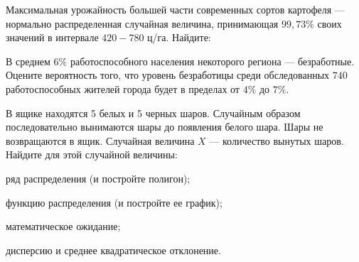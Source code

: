 \vfil

\begin{zkrPlain}{25}\noindent 
	Максимальная урожайность большей части современных сортов картофеля — нормально распределенная случайная величина, принимающая $99{,}73\%$ своих значений в интервале $420-780$ ц/га. Найдите: \par {}
 
\end{zkrPlain}

\vfil

\begin{zkrPlain}{25}\noindent 
	В среднем $ 6 \% $ работоспособного населения некоторого региона --- безработные. Оцените вероятность того, что уровень безработицы среди обследованных $ 740 $ работоспособных жителей города будет в пределах от $ 4 \% $ до $ 7 \% $.
 
\end{zkrPlain}

\newpage\setcounter{zad}{0}\setcounter{footnote}{0}



\begin{zkrPlain}{25}\noindent 
	В ящике находятся 5 белых и 5 черных шаров. Случайным образом последовательно вынимаются шары до появления белого шара. Шары не возвращаются в ящик. Случайная величина $X$ --- количество вынутых шаров.  Найдите для этой случайной величины: \par \smallskip\small{ \par \zz ряд распределения (и постройте полигон); \par \zz функцию распределения (и постройте ее график); \par \zz математическое ожидание; \par \zz дисперсию и среднее квадратическое отклонение.\par \par}
 
\end{zkrPlain}

\vfil

